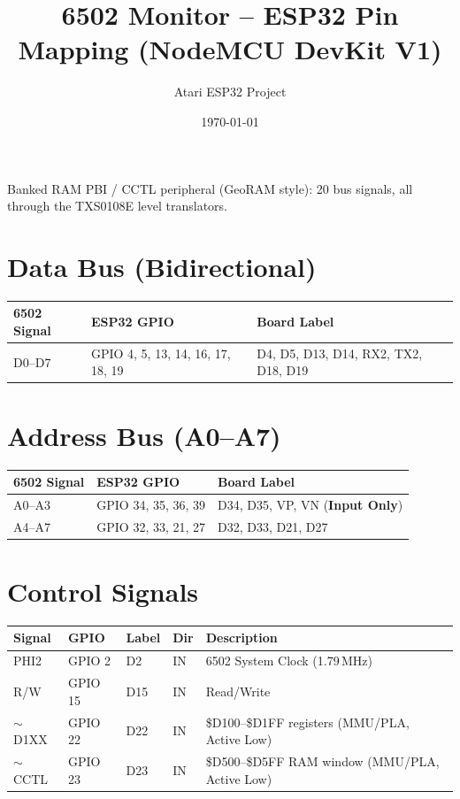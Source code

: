 \documentclass[a4paper,10pt]{article}
\title{6502 Monitor -- ESP32 Pin Mapping (NodeMCU DevKit V1)}
\author{Atari ESP32 Project}
\date{\today}
\begin{document}
\maketitle
\vspace{-4ex}

Banked RAM PBI / CCTL peripheral (GeoRAM style): 20 bus signals, all through the TXS0108E level translators.

\section{Data Bus (Bidirectional)}
\begin{table}[H]
\centering
\begin{tabular}{@{}lll@{}}
\toprule
\textbf{6502 Signal} & \textbf{ESP32 GPIO} & \textbf{Board Label} \\ \midrule
D0--D7 & GPIO 4, 5, 13, 14, 16, 17, 18, 19 & D4, D5, D13, D14, RX2, TX2, D18, D19 \\ \bottomrule
\end{tabular}
\end{table}

\section{Address Bus (A0--A7)}
\begin{table}[H]
\centering
\begin{tabular}{@{}lll@{}}
\toprule
\textbf{6502 Signal} & \textbf{ESP32 GPIO} & \textbf{Board Label} \\ \midrule
A0--A3  & GPIO 34, 35, 36, 39 & D34, D35, VP, VN \quad (\textbf{Input Only}) \\
A4--A7  & GPIO 32, 33, 21, 27 & D32, D33, D21, D27 \\ \bottomrule
\end{tabular}
\end{table}

\section{Control Signals}
\begin{table}[H]
\centering
\begin{tabular}{@{}lllll@{}}
\toprule
\textbf{Signal} & \textbf{GPIO} & \textbf{Label} & \textbf{Dir} & \textbf{Description} \\ \midrule
PHI2         & GPIO 2  & D2  & IN & 6502 System Clock (1.79\,MHz) \\
R/W          & GPIO 15 & D15 & IN & Read/Write \\
$\sim$D1XX   & GPIO 22 & D22 & IN & \$D100--\$D1FF registers (MMU/PLA, Active Low) \\
$\sim$CCTL   & GPIO 23 & D23 & IN & \$D500--\$D5FF RAM window (MMU/PLA, Active Low) \\ \bottomrule
\end{tabular}
\end{table}
\end{document}
